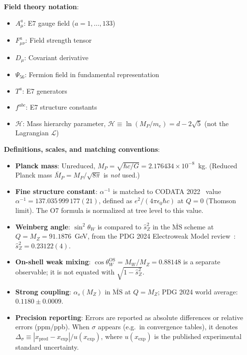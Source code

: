 \documentclass[11pt,a4paper]{article}
\begin{document}
\textbf{Field theory notation}:
\begin{itemize}
\item $A^a_\mu$: E7 gauge field ($a = 1, \ldots, 133$)
\item $F^a_{\mu\nu}$: Field strength tensor
\item $D_\mu$: Covariant derivative
\item $\Psi_{56}$: Fermion field in fundamental representation
\item $T^a$: E7 generators
\item $f^{abc}$: E7 structure constants
\item $\mathcal{H}$: Mass hierarchy parameter, $\mathcal{H} \equiv \ln(M_P/m_e) = d - 2\sqrt{5}$ (not the Lagrangian $\mathcal{L}$)
\end{itemize}

\textbf{Definitions, scales, and matching conventions}:
\begin{itemize}
\item \textbf{Planck mass}: Unreduced, $M_P = \sqrt{\hbar c / G} = 2.176434 \times 10^{-8}$~kg. (Reduced Planck mass $\bar{M}_P = M_P/\sqrt{8\pi}$ is \emph{not} used.)
\item \textbf{Fine structure constant}: $\alpha^{-1}$ is matched to CODATA 2022~\cite{CODATA2022} value $\alpha^{-1} = 137.035\,999\,177(21)$, defined as $e^2/(4\pi\epsilon_0\hbar c)$ at $Q = 0$ (Thomson limit). The O7 formula is normalized at tree level to this value.
\item \textbf{Weinberg angle}: $\sin^2\theta_W$ is compared to $\hat{s}^2_Z$ in the $\overline{\text{MS}}$ scheme at $Q = M_Z = 91.1876$~GeV, from the PDG 2024 Electroweak Model review~\cite{PDG2024}: $\hat{s}^2_Z = 0.23122(4)$.
\item \textbf{On-shell weak mixing}: $\cos\theta_W^{\text{OS}} = M_W/M_Z = 0.88148$ is a separate observable; it is not equated with $\sqrt{1 - \hat{s}^2_Z}$.
\item \textbf{Strong coupling}: $\alpha_s(M_Z)$ in $\overline{\text{MS}}$ at $Q = M_Z$; PDG 2024 world average: $0.1180 \pm 0.0009$.
\item \textbf{Precision reporting}: Errors are reported as absolute differences or relative errors (ppm/ppb). When $\sigma$ appears (e.g.\ in convergence tables), it denotes $\Delta_\sigma \equiv |x_{\text{pred}} - x_{\text{exp}}|/u(x_{\text{exp}})$, where $u(x_{\text{exp}})$ is the published experimental standard uncertainty.
\end{itemize}

\end{document}
